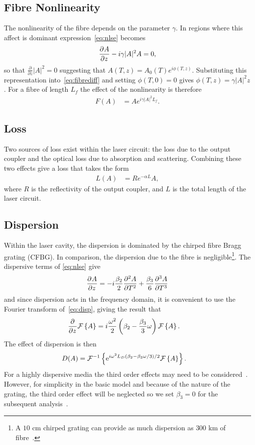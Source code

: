 \subsection{Fibre Nonlinearity}
The nonlinearity of the fibre depends on the parameter $\gamma$. In regions where this affect is dominant expression~\eqref{eq:nlse} becomes
\begin{align}
\label{eq:fibrediff}
	\pdiff{A}{z} - i \gamma |A|^2 A = 0,
\end{align}
so that $\frac{\partial}{\partial z} |A|^2 = 0$ suggesting that $A(T,z) = A_0(T) e^{i \phi(T,z)}$. Substituting this representation into~\eqref{eq:fibrediff} and setting $\phi(T,0)=0$ gives $\phi(T,z) = \gamma |A|^2 z$. For a fibre of length $L_f$ the effect of the nonlinearity is therefore
\begin{align}
\label{eq:fibre}
	F(A) &= A e^{i \gamma |A|^2 L_f}.
\end{align}

\subsection{Loss}
Two sources of loss exist within the laser circuit: the loss due to the output coupler and the optical loss due to absorption and scattering. Combining these two effects give a loss that takes the form
\begin{align}
\label{eq:fibreloss}
	L(A) &= R e^{- \alpha L}A,
\end{align}
where $R$ is the reflectivity of the output coupler, and $L$ is the total length of the laser circuit.

\subsection{Dispersion}
Within the laser cavity, the dispersion is dominated by the chirped fibre Bragg grating (CFBG). In comparison, the dispersion due to the fibre is negligible\footnote{A $10$ cm chirped grating can provide as much dispersion as $300$ km of fibre~\cite{agrawal2002}.}. The dispersive terms of \eqref{eq:nlse} give
\begin{align}
\label{eq:disp}
	\pdiff{A}{z} = -i \frac{\beta_2}{2} \pdiff[2]{A}{T} + \frac{\beta_3}{6} \pdiff[3]{A}{T}
\end{align}
and since dispersion acts in the frequency domain, it is convenient to use the Fourier transform of~\eqref{eq:disp}, giving the result that
\begin{align*}
	\frac{\partial^{}}{\partial{z}^{}}\mathcal{F}\left\{ A \right\} &= i\frac{\omega^2}{2}\left(\beta_2 - \frac{\beta_3}{3} \omega\right) \mathcal{F}\left\{ A \right\}.
\end{align*}
The effect of dispersion is then
\begin{align}
\label{eq:dispersion}
	D(A) &= \FTi{\textrm{e}^{i \omega^2 L_D(\beta_2 - \beta_3 \omega/3)/2} \FT{A}}.
\end{align}
For a highly dispersive media the third order effects may need to be considered~\cite{agrawal2013, litchinitser}. However, for simplicity in the basic model and because of the nature of the grating, the third order effect will be neglected so we set $\beta_3=0$ for the subsequent analysis~\cite{agrawal2013, ferreira}.

